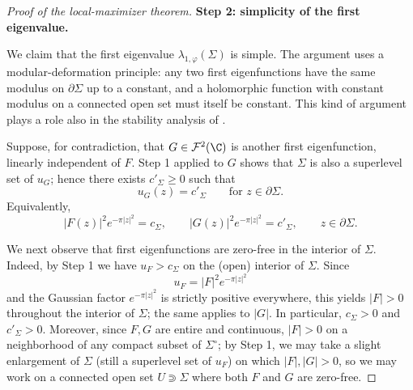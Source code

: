 \begin{proof}[Proof of the local-maximizer theorem]
\medskip
\noindent
{\bf Step 2: simplicity of the first eigenvalue.}

We claim that the first eigenvalue \(\lambda_{1,\varphi}(\Sigma)\) is simple.
The argument uses a modular-deformation principle: any two first eigenfunctions
have the same modulus on \(\partial\Sigma\) up to a constant, and a holomorphic
function with constant modulus on a connected open set must itself be constant.
This kind of argument plays a role also in the stability analysis of
\cite{Gomez-Guerra-Ramos-Tilli}.

Suppose, for contradiction, that \(G\in \mathcal F^2(\C)\) is another first
eigenfunction, linearly independent of \(F\). Step 1 applied to \(G\) shows that
\(\Sigma\) is also a superlevel set of \(u_G\); hence there exists
\(c'_\Sigma\ge 0\) such that
\[
u_G(z)=c'_\Sigma
\qquad\text{for } z\in \partial \Sigma.
\]
Equivalently,
\[
|F(z)|^2 e^{-\pi |z|^2}=c_\Sigma,
\qquad
|G(z)|^2 e^{-\pi |z|^2}=c'_\Sigma,
\qquad z\in \partial \Sigma.
\]

We next observe that first eigenfunctions are zero-free in the interior of
\(\Sigma\). Indeed, by Step 1 we have \(u_F>c_\Sigma\) on the (open) interior of
\(\Sigma\). Since
\[
u_F=|F|^2 e^{-\pi |z|^2}
\]
and the Gaussian factor \(e^{-\pi|z|^2}\) is strictly positive everywhere, this
yields \(|F|>0\) throughout the interior of \(\Sigma\); the same applies to
\(|G|\). In particular, \(c_\Sigma>0\) and \(c'_\Sigma>0\). Moreover, since
\(F,G\) are entire and continuous, \(|F|>0\) on a neighborhood of any compact
subset of \(\Sigma^\circ\); by Step 1, we may take a slight enlargement of
\(\Sigma\) (still a superlevel set of \(u_F\)) on which \(|F|,|G|>0\), so we may
work on a connected open set \(U\Supset \Sigma\) where both \(F\) and \(G\) are
zero-free.


\end{proof}
